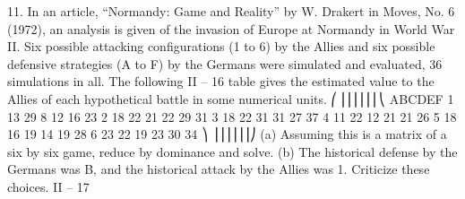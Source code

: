 \documentclass[]{report}
\begin{document}
11. In an article, “Normandy: Game and Reality” by W. Drakert in Moves, No. 6
(1972), an analysis is given of the invasion of Europe at Normandy in World War II. Six
possible attacking configurations (1 to 6) by the Allies and six possible defensive strategies
(A to F) by the Germans were simulated and evaluated, 36 simulations in all. The following
II – 16
table gives the estimated value to the Allies of each hypothetical battle in some numerical
units.
⎛
⎜⎜⎜⎜⎜⎜⎝
ABCDEF
1 13 29 8 12 16 23
2 18 22 21 22 29 31
3 18 22 31 31 27 37
4 11 22 12 21 21 26
5 18 16 19 14 19 28
6 23 22 19 23 30 34
⎞
⎟⎟⎟⎟⎟⎟⎠
(a) Assuming this is a matrix of a six by six game, reduce by dominance and solve.
(b) The historical defense by the Germans was B, and the historical attack by the Allies
was 1. Criticize these choices.
II – 17
\end{document}
